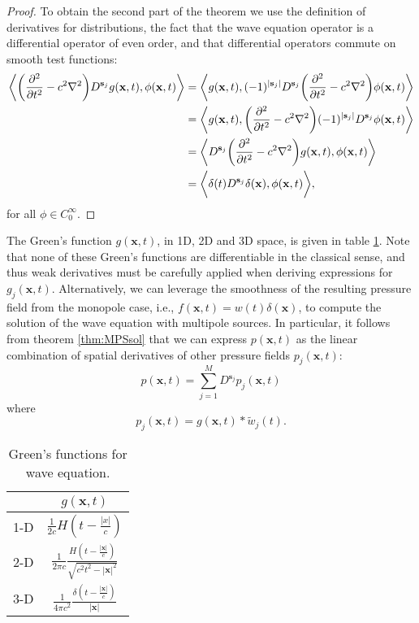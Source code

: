 \begin{proof}
To obtain the second part of the theorem we use the definition of derivatives for distributions, the fact that the wave equation operator is a differential operator of even order, and that differential operators commute on smooth test functions:
\begin{equation*}
\begin{split}		
	\bigg\langle\bigg(\frac{\partial^2}{\partial t^2} - c^2\nabla^2 \bigg) D^{\mathbf s_j} g(\mathbf x,t),\phi(\mathbf x,t) \bigg\rangle
		&= \bigg\langle g(\mathbf x,t), (-1)^{|\mathbf s_j|} D^{\mathbf s_j} \bigg(\frac{\partial^2}{\partial t^2} - c^2\nabla^2 \bigg) \phi(\mathbf x,t) \bigg\rangle \\
		&= \bigg\langle g(\mathbf x,t), \bigg(\frac{\partial^2}{\partial t^2} - c^2\nabla^2 \bigg)(-1)^{|\mathbf s_j|} D^{\mathbf s_j} \phi(\mathbf x,t)\bigg\rangle \\
		&= \bigg\langle D^{\mathbf s_j}\bigg(\frac{\partial^2}{\partial t^2} - c^2\nabla^2 \bigg) g(\mathbf x,t), \phi(\mathbf x,t) \bigg\rangle \\
		&= \bigg\langle \delta(t) D^{\mathbf s_j} \delta(\mathbf x), \phi(\mathbf x,t)\bigg\rangle,
\end{split}
\end{equation*}
for all $\phi\in C_0^\infty$.
\end{proof}

The Green's function $g(\mathbf x,t)$, in 1D, 2D and 3D space, is given in table \ref{tab:Gfun}.
Note that none of these Green's functions are differentiable in the classical sense, and thus weak derivatives must be carefully applied when deriving expressions for $g_j(\mathbf x,t)$.
Alternatively, we can leverage the smoothness of the resulting pressure field from the monopole case, i.e., $f(\mathbf x,t) = w(t)\delta(\mathbf x)$, to compute the solution of the wave equation with multipole sources. 
In particular, it follows from theorem \ref{thm:MPSsol} that we can express $p(\mathbf x,t)$ as the linear combination of spatial derivatives of other pressure fields $p_j(\mathbf x,t)$:
\[
	p(\mathbf x,t) = \sum_{j=1}^M D^{\mathbf s_j} p_j(\mathbf x,t)
\]
where
\[
	p_j(\mathbf x,t) = g(\mathbf x,t) * \tilde w_j(t).
\]

\begin{table}[!h]
	\centering
	\begin{tabular}{c | c }
		  	& $g(\mathbf x,t)$ \\  \hline 
		1-D & $\displaystyle \frac{1}{2c} H(t-\tfrac{|x|}{c})$ \vspace{5pt}\\ \hline \vspace{5pt}
		2-D & $\displaystyle \frac{1}{2\pi c} \frac{H(t-\frac{|\mathbf x|}{c})}{\sqrt{c^2t^2 - |\mathbf x|^2}}$ \\ \hline
		3-D & $\displaystyle \frac{1}{4\pi c^2} \frac{\delta(t-\tfrac{|\mathbf x|}{c})}{|\mathbf x|} $
	\end{tabular}
	\caption{Green's functions for wave equation.}
	\label{tab:Gfun}
\end{table}


